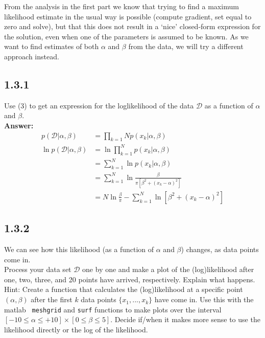 \documentclass[a4paper]{article}
\begin{document}
From the analysis in the first part we know that trying to find a maximum likelihood estimate in the usual way is possible (compute gradient, set equal to zero and solve), but that this does not result in a ‘nice’ closed-form expression for the solution, even when one of the parameters is assumed to be known. As we want to find estimates of both $\alpha$ and $\beta$ from the data, we will try a different approach instead.

\subsection*{1.3.1}

Use (3) to get an expression for the loglikelihood of the data $\mathcal{D}$ as a function of $\alpha$ and $\beta$.\\

\textbf{Answer:}\\

\begin{align*}
p(\mathcal{D}| \alpha, \beta) &= \prod_{k = 1}N p(x_k | \alpha, \beta)\\
\ln p(\mathcal{D} | \alpha, \beta) &= \ln \prod_{k = 1}^N p(x_k | \alpha, \beta)\\
&= \sum_{k = 1}^N \ln p(x_k | \alpha, \beta)\\
&= \sum_{k = 1}^N \ln \frac{\beta}{\pi [\beta^2 + (x_k - \alpha)^2]}\\
&= N \ln \frac{\beta}{\pi} - \sum_{k = 1}^N \ln [ \beta^2 + (x_k - \alpha)^2]
\end{align*}

\subsection*{1.3.2}

We can see how this likelihood (as a function of $\alpha$ and $\beta$) changes, as data points come in.\\

Process your data set $\mathcal{D}$ one by one and make a plot of the (log)likelihood after one, two, three, and 20 points have arrived, respectively. Explain what happens.\\

Hint: Create a function that calculates the (log)likelihood at a specific point $(\alpha, \beta)$ after the first $k$ data points $\{x_1, . . . , x_k \}$ have come in. Use this with the matlab \texttt{ meshgrid} and \texttt{surf}  functions to make plots over the interval $[-10 \leq \alpha \leq +10] \times [0 \leq \beta \leq 5]$. Decide if/when it makes more sense to use the likelihood directly or the log of the likelihood.\\
\end{document}
